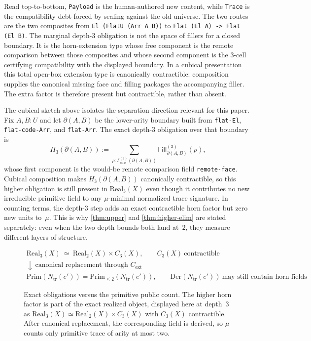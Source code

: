 \documentclass{lmcs}
\newcommand{\Real}{\mathrm{Real}}
\newcommand{\Prim}{\mathrm{Prim}}
\newcommand{\Der}{\mathrm{Der}}
\newcommand{\Cext}{C_{\mathrm{ext}}}
\begin{document}
Read top-to-bottom, \texttt{Payload} is the human-authored new content, while \texttt{Trace} is the compatibility debt forced by sealing against the old universe. The two routes are the two composites from \texttt{El (FlatU (Arr A B))} to \texttt{Flat (El A) -> Flat (El B)}. The marginal depth-$3$ obligation is not the space of fillers for a closed boundary. It is the horn-extension type whose free component is the remote comparison between those composites and whose second component is the $3$-cell certifying compatibility with the displayed boundary. In a cubical presentation this total open-box extension type is canonically contractible: composition supplies the canonical missing face and filling packages the accompanying filler. The extra factor is therefore present but contractible, rather than absent.

\begin{rem}
\label{rem:toy-separation}
The cubical sketch above isolates the separation direction relevant for this paper. Fix $A,B:U$ and let $\partial(A,B)$ be the lower-arity boundary built from \texttt{flat-El}, \texttt{flat-code-Arr}, and \texttt{flat-Arr}. The exact depth-$3$ obligation over that boundary is
\[
  H_3(\partial(A,B))
  :=
  \sum_{\rho : \Gamma^{(3)}_{\mathrm{miss}}(\partial(A,B))}
  \mathsf{Fill}^{(3)}_{\partial(A,B)}(\rho),
\]
whose first component is the would-be remote comparison field \texttt{remote-face}. Cubical composition makes $H_3(\partial(A,B))$ canonically contractible, so this higher obligation is still present in $\Real_3(X)$ even though it contributes no new irreducible primitive field to any $\mu$-minimal normalized trace signature. In counting terms, the depth-$3$ step adds an exact contractible horn factor but zero new units to~$\mu$. This is why \autoref{thm:upper} and \autoref{thm:higher-elim} are stated separately: even when the two depth bounds both land at~$2$, they measure different layers of structure.
\end{rem}

\begin{figure}[t]
\centering
\[
\begin{array}{c}
\Real_3(X)\ \simeq\ \Real_2(X)\times C_3(X),
\qquad C_3(X)\ \text{contractible}
\\[1.0ex]
\downarrow\ \text{canonical replacement through }\Cext
\\[1.0ex]
\Prim(N_{\mathrm{tr}}(e'))=\Prim_{\leq2}(N_{\mathrm{tr}}(e')),
\qquad
\Der(N_{\mathrm{tr}}(e'))\ \text{may still contain horn fields}
\end{array}
\]
\caption{Exact obligations versus the primitive public count. The higher horn factor is part of the exact realized object, displayed here at depth~$3$ as $\Real_3(X)\simeq\Real_2(X)\times C_3(X)$ with $C_3(X)$ contractible. After canonical replacement, the corresponding field is derived, so $\mu$ counts only primitive trace of arity at most two.}
\label{fig:exact-vs-public-count}
\end{figure}
\end{document}
